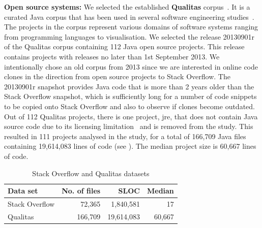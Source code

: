 \documentclass[10pt,journal,compsoc]{IEEEtran}
\begin{document}
\textbf{Open source systems: }
We selected the established \textbf{Qualitas} corpus~\cite{QualitasCorpus}. It is a curated Java corpus that has been used in several
software engineering
studies~\cite{Taube-Schock2011,Beckman2011,Vasilescu2011,Omar2012}. The
projects in the corpus represent various domains of software systems
ranging from programming languages to
visualisation. We selected the release 20130901r
of the Qualitas corpus containing 112 Java open source projects. This
release contains projects with releases no later than 1st September
2013. We intentionally chose an old corpus from 2013 since we are interested in
online code clones in the direction from open source projects to Stack
Overflow. The 20130901r snapshot provides Java code that is more than
2 years older than the Stack Overflow snapshot, which is sufficiently
long for a number of code snippets to be copied onto Stack Overflow
and also to observe if clones become outdated. Out of 112 Qualitas
projects, there is one project, \textsf{jre}, that does not contain
Java source code due to its licensing limitation~\cite{QualitasCorpus}
and is removed from the study. This resulted in 111
projects analysed in the study, for a total of 166,709 Java files containing 19,614,083
lines of code (see ). The median project size is 60,667 lines of code.

\begin{table}
	\centering
	\caption{Stack Overflow and Qualitas datasets}
	\label{tab:datasets}
	\begin{tabular}{lrrr}
		\toprule
		Data set & No. of files & SLOC & Median \\
		\midrule
		Stack Overflow & 72,365 & 1,840,581 & 17 \\ 
		Qualitas &  166,709 & 19,614,083 & 60,667 \\ 
		\bottomrule
	\end{tabular} 
\end{table}
\end{document}
